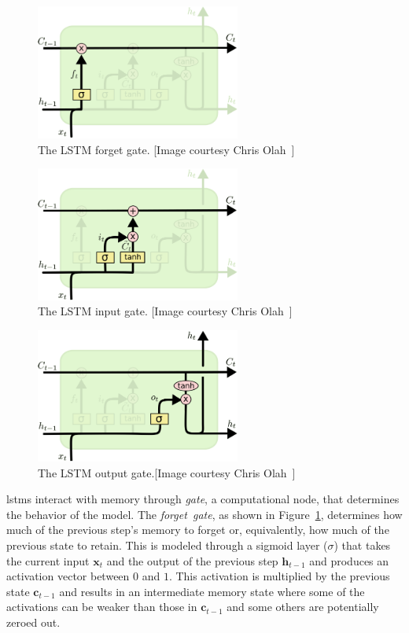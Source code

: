 \begin{figure}[p]
	\centering
	\includegraphics[width=0.6\textwidth]{figures/LSTM_forget_gate.pdf}
	\caption[The LSTM forget gate]
	{The LSTM forget gate. [Image courtesy Chris Olah~\cite{colah_15}]\label{fig:LSTM_forget_gate}}
\end{figure}
\begin{figure}[p]
	\centering
	\includegraphics[width=0.6\textwidth]{figures/LSTM_input_gate.pdf}
	\caption[The LSTM input gate]
	{The LSTM input gate. [Image courtesy Chris Olah~\cite{colah_15}]\label{fig:LSTM_input_gate}}
\end{figure}
\begin{figure}[p]
	\centering
	\includegraphics[width=0.6\textwidth]{figures/LSTM_output_gate.pdf}
	\caption[The LSTM output gate]
	{The LSTM output gate.[Image courtesy Chris Olah~\cite{colah_15}]\label{fig:LSTM_output_gate}}
\end{figure}


\gls{lstm}s interact with memory through \emph{gate}, a computational node, that determines the behavior of the model. The \emph{forget~gate}, as shown in Figure~\ref{fig:LSTM_forget_gate}, determines how much of the previous step's memory to forget or, equivalently, how much of the previous state to retain.  This is modeled through a sigmoid layer ($\sigma$) that takes the current input $\textbf{x}_t$ and the output of the previous step $\mathbf{h}_{t-1}$ and produces an activation vector between $0$ and $1$.  This activation is multiplied by the previous state $\mathbf{c}_{t-1}$ and results in an intermediate memory state where some of the activations can be weaker than those in $\mathbf{c}_{t-1}$ and some others are potentially zeroed out.

